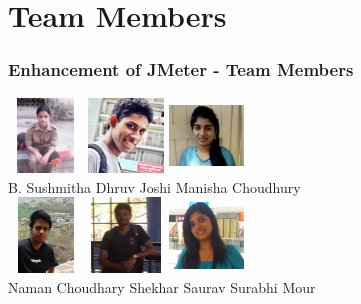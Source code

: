 \documentclass[12pt]{beamer}
\begin{document}
\section{Team Members}
\begin{frame}
 \frametitle{Enhancement of JMeter - Team Members}
  \hspace{0.5cm}\includegraphics[width=2cm, height=2cm]{images/sushmitha}\hspace{1.5cm}
  \includegraphics[width=2cm, height=2cm]{images/dhruv}\hspace{1.5cm}
  \includegraphics[width=2cm, height=2cm]{images/manisha}\\
  B. Sushmitha\hspace{1.5cm} 	Dhruv Joshi \hspace{1.5cm} Manisha Choudhury\\
  \vspace{0.5cm}
  \hspace{0.5cm}\includegraphics[width=2cm, height=2cm]{images/naman}\hspace{1.5cm}
  \includegraphics[width=2cm, height=2cm]{images/shekhar}\hspace{1.5cm}
  \includegraphics[width=2cm, height=2cm]{images/surabhi}\\
  Naman Choudhary \hspace{0.5cm} Shekhar Saurav \hspace{0.5cm} Surabhi Mour
  
\end{frame}
\end{document}
